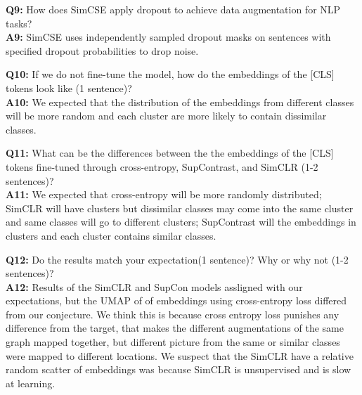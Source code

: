 \documentclass{article}
\begin{document}
    \textbf{Q9:} How does SimCSE apply dropout to achieve data augmentation for NLP tasks?\\
    \textbf{A9:} SimCSE uses independently sampled dropout masks on sentences with specified dropout probabilities to drop noise.

    \textbf{Q10:} If we do not fine-tune the model, how do the embeddings of the [CLS] tokens look like (1 sentence)?\\
    \textbf{A10:} We expected that the distribution of the embeddings from different classes will be more random and each cluster are more likely to contain dissimilar classes.


    \textbf{Q11:} What can be the differences between the the embeddings of the [CLS] tokens fine-tuned through cross-entropy, SupContrast, and SimCLR (1-2 sentences)?\\
    \textbf{A11:} We expected that cross-entropy will be more randomly distributed; SimCLR will have clusters but dissimilar classes may come into the same cluster and same classes will go to different clusters; SupContrast will the embeddings in clusters and each cluster contains similar classes.

    \textbf{Q12:} Do the results match your expectation(1 sentence)? Why or why not (1-2 sentences)?\\
    \textbf{A12:} Results of the SimCLR and SupCon models assligned with our expectations, but the UMAP of of embeddings using cross-entropy loss differed from our conjecture. 
    We think this is because cross entropy loss punishes any difference from the target, that makes the different augmentations of the same graph mapped together, but different picture from the same or similar classes were mapped to different locations.
    We suspect that the SimCLR have a relative random scatter of embeddings was because SimCLR is unsupervised and is slow at learning. 
\end{document}
